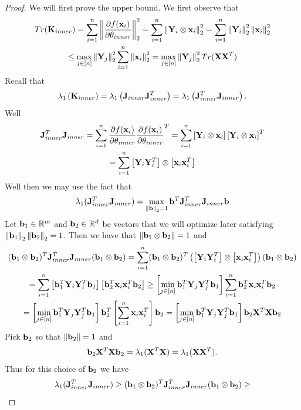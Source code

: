 \begin{proof}
We will first prove the upper bound.  We first observe that
\begin{gather*}
Tr(\mathbf{K}_{inner}) = \sum_{i = 1}^n \left\lVert\frac{\partial f(\mathbf{x}_i)}{\partial \mathbf{\theta}_{inner}}\right\rVert_2^2 = \sum_{i = 1}^n \left\lVert\mathbf{Y}_i \otimes \mathbf{x}_i\right\rVert_2^2 = \sum_{i = 1}^n \left\lVert\mathbf{Y}_i\right\rVert_2^2 \left\lVert\mathbf{x}_i\right\rVert_2^2 \\
\leq \max_{j \in [n]} \left\lVert\mathbf{Y}_j\right\rVert_2^2 \sum_{i = 1}^n \left\lVert\mathbf{x}_i\right\rVert_2^2 = \max_{j \in [n]} \left\lVert\mathbf{Y}_j\right\rVert_2^2 Tr(\mathbf{X} \mathbf{X}^T)
\end{gather*}
\noindent
Recall that
\[ \lambda_1\left(\mathbf{K}_{inner}\right) = \lambda_1\left(\mathbf{J}_{inner} \mathbf{J}_{inner}^T\right) = \lambda_1 \left(\mathbf{J}_{inner}^T \mathbf{J}_{inner}\right). \]
Well
\begin{gather*}
\mathbf{J}_{inner}^T \mathbf{J}_{inner} = \sum_{i = 1}^n \frac{\partial f(\mathbf{x}_i)}{\partial \mathbf{\theta}_{inner}} \frac{\partial f(\mathbf{x}_i)}{\partial \mathbf{\theta}_{inner}}^T = \sum_{i = 1}^n \left[\mathbf{Y}_i \otimes \mathbf{x}_i\right] \left[\mathbf{Y}_i \otimes \mathbf{x}_i\right]^T \\
= \sum_{i = 1}^n \left[\mathbf{Y}_i \mathbf{Y}_i^T\right] \otimes \left[\mathbf{x}_i \mathbf{x}_i^T\right]    
\end{gather*}
Well then we may use the fact that
\[ \lambda_1(\mathbf{J}_{inner}^T \mathbf{J}_{inner}) = \max_{\left\lVert\mathbf b\right\rVert_2 = 1} \mathbf b^T \mathbf{J}_{inner}^T \mathbf{J}_{inner} \mathbf b \]
Let $\mathbf b_1 \in \mathbb{R}^m$ and $\mathbf b_2 \in \mathbb{R}^d$ be vectors that we will optimize later satisfying $\left\lVert\mathbf b_1\right\rVert_2 \left\lVert\mathbf b_2\right\rVert_2 = 1$.  Then we have that $\left\lVert\mathbf b_1 \otimes \mathbf b_2\right\rVert = 1$ and
\begin{gather*}
(\mathbf b_1 \otimes \mathbf b_2)^T \mathbf{J}_{inner}^T \mathbf{J}_{inner} (\mathbf b_1 \otimes \mathbf b_2) = \sum_{i = 1}^n (\mathbf b_1 \otimes \mathbf b_2)^T \left(\left[\mathbf{Y}_i \mathbf{Y}_i^T\right] \otimes \left[\mathbf{x}_i \mathbf{x}_i^T\right]\right)  (\mathbf b_1 \otimes \mathbf b_2) \\
=\sum_{i = 1}^n \left[\mathbf b_1^T \mathbf{Y}_i \mathbf{Y}_i^T \mathbf b_1\right] \left[\mathbf b_2^T \mathbf{x}_i \mathbf{x}_i^T \mathbf b_2\right] \geq \left[\min_{j \in [n]} \mathbf b_1^T \mathbf{Y}_j \mathbf{Y}_j^T \mathbf b_1\right] \sum_{i = 1}^n \mathbf b_2^T \mathbf{x}_i \mathbf{x}_i^T \mathbf b_2 \\
= \left[\min_{j \in [n]} \mathbf b_1^T \mathbf{Y}_j \mathbf{Y}_j^T \mathbf b_1\right] \mathbf b_2^T \left[\sum_{i = 1}^n \mathbf{x}_i \mathbf{x}_i^T\right] \mathbf b_2 = \left[\min_{j \in [n]} \mathbf b_1^T \mathbf{Y}_j \mathbf{Y}_j^T \mathbf b_1\right] \mathbf b_2 \mathbf{X}^T \mathbf{X} \mathbf b_2
\end{gather*}
Pick $\mathbf b_2$ so that $\left\lVert\mathbf b_2\right\rVert = 1$ and
\[ \mathbf b_2 \mathbf{X}^T \mathbf{X} \mathbf b_2 = \lambda_1(\mathbf{X}^T \mathbf{X}) = \lambda_1(\mathbf{X} \mathbf{X}^T). \]
Thus for this choice of $\mathbf b_2$ we have
\begin{gather*}
\lambda_1(\Jb_{inner}^T \Jb_{inner}) \geq (\vb_1 \otimes \vb_2)^T \Jb_{inner}^T \Jb_{inner} (\vb_1 \otimes \vb_2) \geq \\

\end{gather*}
\end{proof}
